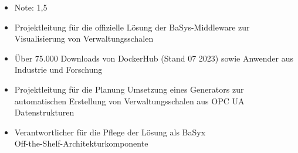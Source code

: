 \documentclass[10pt,a4paper,ragged2e,withhyper]{altacv}
\begin{document}
\begin{paracol}{2}
            \begin{itemize}
                \item Note: 1,5
            \end{itemize}
        
            \begin{itemize}
                \item Projektleitung für die offizielle Lösung der BaSys-Middleware zur Visualisierung von Verwaltungsschalen
                \item Über 75.000 Downloads von DockerHub (Stand 07 2023) sowie Anwender aus Industrie und Forschung
            \end{itemize}
            \divider
            
            \begin{itemize}
                \item Projektleitung für die Planung Umsetzung eines Generators zur automatischen Erstellung von Verwaltungsschalen aus OPC UA Datenstrukturen
                \item Verantwortlicher für die Pflege der Lösung als BaSyx\\ Off-the-Shelf-Architekturkomponente
            \end{itemize}
    \end{paracol}
\end{document}
